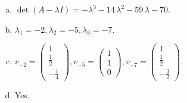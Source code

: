 \begin{questions}
\begin{solution}
\begin{enumerate}[(a)]
\item $\det(A-\lambda I)=-{\lambda}^{3} - 14 \, {\lambda}^{2} - 59 \, {\lambda} - 70$.
\item ${\lambda}_1=-2, {\lambda}_2=-5, {\lambda}_3=-7$.
\item $v_{-2}=\left(\begin{array}{r}
1 \\
\frac{1}{2} \\
-\frac{1}{4}
\end{array}\right), v_{-5}=\left(\begin{array}{r}
1 \\
1 \\
0
\end{array}\right), v_{-7}=\left(\begin{array}{r}
1 \\
\frac{1}{2} \\
-\frac{3}{2}
\end{array}\right)$.
\item Yes.
\end{enumerate}
\end{solution}

\end{questions}

\newpage


\begin{center}
\end{center}

